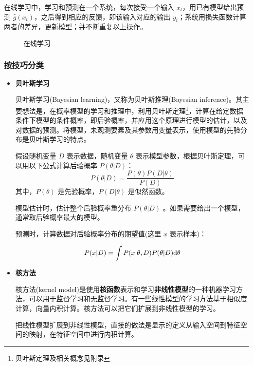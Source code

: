 在线学习中，学习和预测在一个系统，每次接受一个输入 $x_t$，用已有模型给出预测 $\hat{g}(x_t)$，之后得到相应的反馈，即该输入对应的输出 $y_t$；系统用损失函数计算两者的差异，更新模型；并不断重复以上操作。

\begin{figure}[H]
    \centering
    \caption{在线学习}
\end{figure}

\subsubsection{按技巧分类}
\begin{itemize}
    \item \textbf{贝叶斯学习}
    
    贝叶斯学习(Bayesian learning)，又称为贝叶斯推理(Bayesian inference)。其主要想法是，在概率模型的学习和推理中，利用贝叶斯定理\footnote{贝叶斯定理及相关概念见附录}，计算在给定数据条件下模型的条件概率，即后验概率，并应用这个原理进行模型的估计，以及对数据的预测。将模型，未观测要素及其参数用变量表示，使用模型的先验分布是贝叶斯学习的特点。

    假设随机变量 $D$ 表示数据，随机变量 $\theta$ 表示模型参数，根据贝叶斯定理，可以用以下公式计算后验概率 $P(\theta|D)$：
    \begin{equation}
        P(\theta|D) = \frac{P(\theta)P(D|\theta)}{P(D)}
    \end{equation}
    其中，$P(\theta)$ 是先验概率，$P(D|\theta)$ 是似然函数。

    模型估计时，估计整个后验概率重分布 $P(\theta|D)$ 。如果需要给出一个模型，通常取后验概率最大的模型。

    预测时，计算数据对后验概率分布的期望值(这里 $x$ 表示样本)：

    \begin{equation}
        P(x|D) = \int P(x|\theta,D) P(\theta|D) \rm{d}\theta
    \end{equation}

    \item \textbf{核方法}
    
    核方法(kernel model)是使用\textbf{核函数}表示和学习\textbf{非线性模型}的一种机器学习方法，可以用于监督学习和无监督学习。有一些线性模型的学习方法基于相似度计算，向量内积计算。核方法可以把它们扩展到非线性模型的学习。

    把线性模型扩展到非线性模型，直接的做法是显示的定义从输入空间到特征空间的映射，在特征空间中进行内积计算。
\end{itemize}

